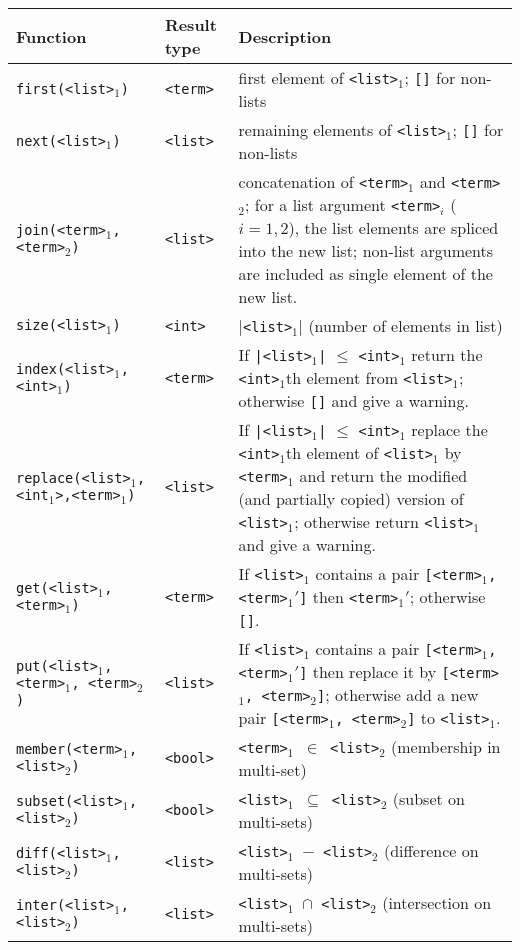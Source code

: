 \documentclass[a4,twoside,noweb]{article} %
\begin{document}
\begin{tabular}{|l|l|p{8cm}|} \hline
 Function			& Result type 	& Description \\ \hline
 {\tt first(<list>$_1$)}		& {\tt  <term>}  & first element of {\tt <list>$_1$}; {\tt []} for non-lists\\
 {\tt next(<list>$_1$)}			& {\tt  <list>}  & remaining elements of {\tt <list>$_1$}; {\tt []} for non-lists \\
 {\tt join(<term>$_1$,<term>$_2$)}	& {\tt  <list>}  & concatenation of {\tt <term>$_1$} and {\tt <term>$_2$};
							   for a list argument {\tt <term>$_i$} ($i=1,2$),
							   the list elements are spliced into the new list;
							   non-list arguments are included as single element of the
							   new list. \\
 {\tt size(<list>$_1$)}			& {\tt  <int>} 	 & {\tt $|$<list>$_1|$} (number of elements in list)\\ \hline

 {\tt index(<list>$_1$,<int>$_1$)}	& {\tt <term>}	 & If {\tt |<list>$_1$|} $\leq$ {\tt <int>$_1$} return the
							   {\tt <int>$_1$}th element from {\tt <list>$_1$};
						           otherwise {\tt []} and give a warning.\\
 {\tt replace(<list>$_1$,<int$_1$>,<term>$_1$)} & {\tt <list>}	 &  If {\tt |<list>$_1$|} $\leq$ {\tt <int>$_1$} replace the
							   {\tt <int>$_1$}th element of {\tt <list>$_1$} by 
							   {\tt <term>$_1$} and return the modified (and partially
							   copied) version of {\tt <list>$_1$};
						           otherwise return {\tt <list>$_1$} and give a warning.\\  \hline

 {\tt get(<list>$_1$,<term>$_1$)}	& {\tt <term>}	 & If {\tt <list>$_1$} contains a pair
							   {\tt [<term>$_1$, <term>$_1'$]} then {\tt <term>$_1'$};
						           otherwise {\tt []}.\\
 {\tt put(<list>$_1$,<term>$_1$, <term>$_2$)}	& {\tt <list>}	 & If {\tt <list>$_1$} contains a pair
							   {\tt [<term>$_1$, <term>$_1'$]} then replace it by
							   {\tt [<term>$_1$, <term>$_2$]}; otherwise add a new pair	
							   {\tt [<term>$_1$, <term>$_2$]} to {\tt <list>$_1$}. \\ \hline


 {\tt member(<term>$_1$,<list>$_2$)}	& {\tt  <bool>}  & {\tt <term>$_1$ $\in$ <list>$_2$} (membership in multi-set)\\
 {\tt subset(<list>$_1$, <list>$_2$)}	& {\tt  <bool>}  & {\tt <list>$_1$ $\subseteq$ <list>$_2$} (subset on multi-sets)\\
 {\tt diff(<list>$_1$, <list>$_2$)}	& {\tt  <list>}  & {\tt <list>$_1$ $-$ <list>$_2$} (difference on multi-sets)\\
 {\tt inter(<list>$_1$, <list>$_2$)}	& {\tt  <list>}  & {\tt <list>$_1$ $\cap$ <list>$_2$} (intersection on multi-sets)\\ \hline
\end{tabular}
\end{document}
